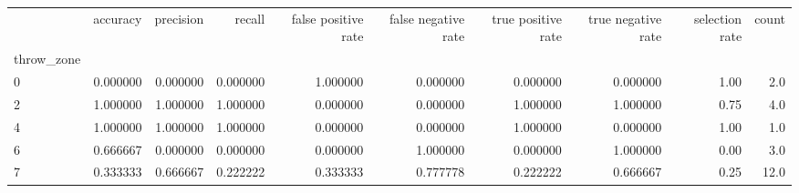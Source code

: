 \begin{tabular}{lrrrrrrrrr}
\toprule
{} &  accuracy &  precision &    recall &  false positive rate &  false negative rate &  true positive rate &  true negative rate &  selection rate &  count \\
throw\_zone &           &            &           &                      &                      &                     &                     &                 &        \\
\midrule
0          &  0.000000 &   0.000000 &  0.000000 &             1.000000 &             0.000000 &            0.000000 &            0.000000 &            1.00 &    2.0 \\
2          &  1.000000 &   1.000000 &  1.000000 &             0.000000 &             0.000000 &            1.000000 &            1.000000 &            0.75 &    4.0 \\
4          &  1.000000 &   1.000000 &  1.000000 &             0.000000 &             0.000000 &            1.000000 &            0.000000 &            1.00 &    1.0 \\
6          &  0.666667 &   0.000000 &  0.000000 &             0.000000 &             1.000000 &            0.000000 &            1.000000 &            0.00 &    3.0 \\
7          &  0.333333 &   0.666667 &  0.222222 &             0.333333 &             0.777778 &            0.222222 &            0.666667 &            0.25 &   12.0 \\
\bottomrule
\end{tabular}
